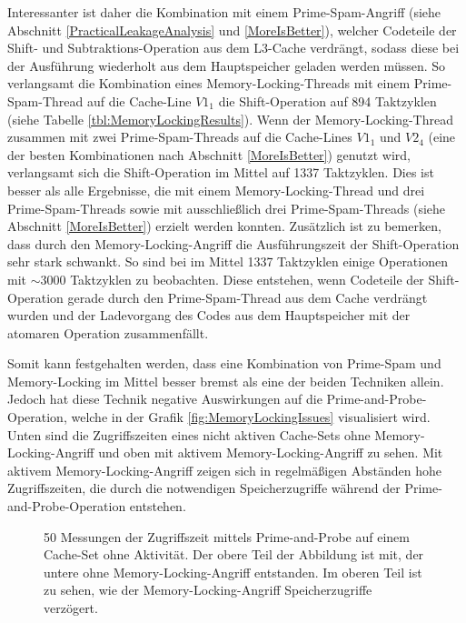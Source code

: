 Interessanter ist daher die Kombination mit einem Prime-Spam-Angriff (siehe Abschnitt \ref{PracticalLeakageAnalysis} und \ref{MoreIsBetter}), welcher Codeteile der Shift- und Subtraktions-Operation aus dem L3-Cache verdrängt, sodass diese bei der Ausführung wiederholt aus dem Hauptspeicher geladen werden müssen.
So verlangsamt die Kombination eines Memory-Locking-Threads mit einem Prime-Spam-Thread auf die Cache-Line $V1_1$ die Shift-Operation auf 894 Taktzyklen (siehe Tabelle \ref{tbl:MemoryLockingResults}).
Wenn der Memory-Locking-Thread zusammen mit zwei Prime-Spam-Threads auf die Cache-Lines $V1_1$ und $V2_4$ (eine der besten Kombinationen nach Abschnitt \ref{MoreIsBetter}) genutzt wird, verlangsamt sich die Shift-Operation im Mittel auf 1337 Taktzyklen.
Dies ist besser als alle Ergebnisse, die mit einem Memory-Locking-Thread und drei Prime-Spam-Threads sowie mit ausschließlich drei Prime-Spam-Threads (siehe Abschnitt \ref{MoreIsBetter}) erzielt werden konnten.
Zusätzlich ist zu bemerken, dass durch den Memory-Locking-Angriff die Ausführungszeit der Shift-Operation sehr stark schwankt.
So sind bei im Mittel 1337 Taktzyklen einige Operationen mit $\sim$3000 Taktzyklen zu beobachten.
Diese entstehen, wenn Codeteile der Shift-Operation gerade durch den Prime-Spam-Thread aus dem Cache verdrängt wurden und der Ladevorgang des Codes aus dem Hauptspeicher mit der atomaren Operation zusammenfällt.

Somit kann festgehalten werden, dass eine Kombination von Prime-Spam und Memory-Locking im Mittel besser bremst als eine der beiden Techniken allein.
Jedoch hat diese Technik negative Auswirkungen auf die Prime-and-Probe-Operation, welche in der Grafik \ref{fig:MemoryLockingIssues} visualisiert wird.
Unten sind die Zugriffszeiten eines nicht aktiven Cache-Sets ohne Memory-Locking-Angriff und oben mit aktivem Memory-Locking-Angriff zu sehen.
Mit aktivem Memory-Locking-Angriff zeigen sich in regelmäßigen Abständen hohe Zugriffszeiten, die durch die notwendigen Speicherzugriffe während der Prime-and-Probe-Operation entstehen.

\label{fig:MemoryLockingIssues}
\begin{figure}[h]
\centering
\begin{scaletikzpicturetowidth}{\textwidth}

\end{scaletikzpicturetowidth}
\caption{50 Messungen der Zugriffszeit mittels Prime-and-Probe auf einem Cache-Set ohne Aktivität. Der obere Teil der Abbildung ist mit, der untere ohne Memory-Locking-Angriff entstanden. Im oberen Teil ist zu sehen, wie der Memory-Locking-Angriff Speicherzugriffe verzögert.}
\end{figure}

